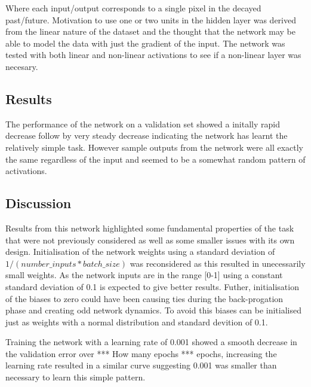 
Where each input/output corresponds to a single pixel in the decayed past/future.
Motivation to use one or two units in the hidden layer was derived from the linear nature of the dataset and the thought that the network may be able to model the data with just the gradient of the input.
The network was tested with both linear and non-linear activations to see if a non-linear layer was necesary.

\subsection{Results}
The performance of the network on a validation set showed a initally rapid decrease follow by very steady decrease indicating the network has learnt the relatively simple task.
However sample outputs from the network were all exactly the same regardless of the input and seemed to be a somewhat random pattern of activations.


\subsection{Discussion}
Results from this network highlighted some fundamental properties of the task that were not previously considered as well as some smaller issues with its own design.
Initialisation of the network weights using a standard deviation of $1 / ( number\_inputs * batch\_size )$ was reconsidered as this resulted in unecessarily small weights. 
As the network inputs are in the range [0-1] using a constant standard deviation of 0.1 is expected to give better results. 
Futher, initialisation of the biases to zero could have been causing ties during the back-progation phase and creating odd network dynamics.
To avoid this biases can be initialised just as weights with a normal distribution and standard devition of 0.1.

Training the network with a learning rate of 0.001 showed a smooth decrease in the validation error over *** How many epochs *** epochs, increasing the learning rate resulted in a similar curve suggesting 0.001 was smaller than necessary to learn this simple pattern. 

